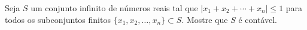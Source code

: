 Seja \(S\) um conjunto infinito de números reais tal que \(|x_1+x_2+\cdots + x_n | \leq 1 \) para todos os subconjuntos finitos \(\{x_1,x_2,\ldots,x_n\} \subset S\). Mostre que \(S\) é contável.
